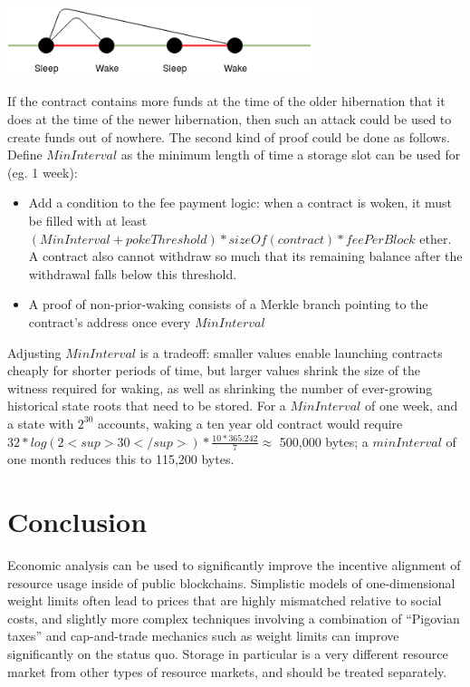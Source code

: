 \documentclass[12pt, final]{article}
\begin{document}
\begin{center}
\includegraphics[width=3.5in]{sleepwake.png} \\
\end{center}

If the contract contains more funds at the time of the older hibernation that it does at the time of the newer hibernation, then such an attack could be used to create funds out of nowhere. The second kind of proof could be done as follows. Define $MinInterval$ as the minimum length of time a storage slot can be used for (eg. 1 week):

\begin{itemize}
\item Add a condition to the fee payment logic: when a contract is woken, it must be filled with at least $(MinInterval + pokeThreshold) * sizeOf(contract) * feePerBlock$ ether. A contract also cannot withdraw so much that its remaining balance after the withdrawal falls below this threshold.
\item A proof of non-prior-waking consists of a Merkle branch pointing to the contract's address once every $MinInterval$
\end{itemize}

Adjusting $MinInterval$ is a tradeoff: smaller values enable launching contracts cheaply for shorter periods of time, but larger values shrink the size of the witness required for waking, as well as shrinking the number of ever-growing historical state roots that need to be stored. For a $MinInterval$ of one week, and a state with $2^{30}$ accounts, waking a ten year old contract would require $32 * log(2<sup>30</sup>) * \frac{10 * 365.242}{7} \approx$ 500,000 bytes; a $minInterval$ of one month reduces this to 115,200 bytes.

\section{Conclusion}

Economic analysis can be used to significantly improve the incentive alignment of resource usage inside of public blockchains. Simplistic models of one-dimensional weight limits often lead to prices that are highly mismatched relative to social costs, and slightly more complex techniques involving a combination of ``Pigovian taxes'' and cap-and-trade mechanics such as weight limits can improve significantly on the status quo. Storage in particular is a very different resource market from other types of resource markets, and should be treated separately.
\end{document}
